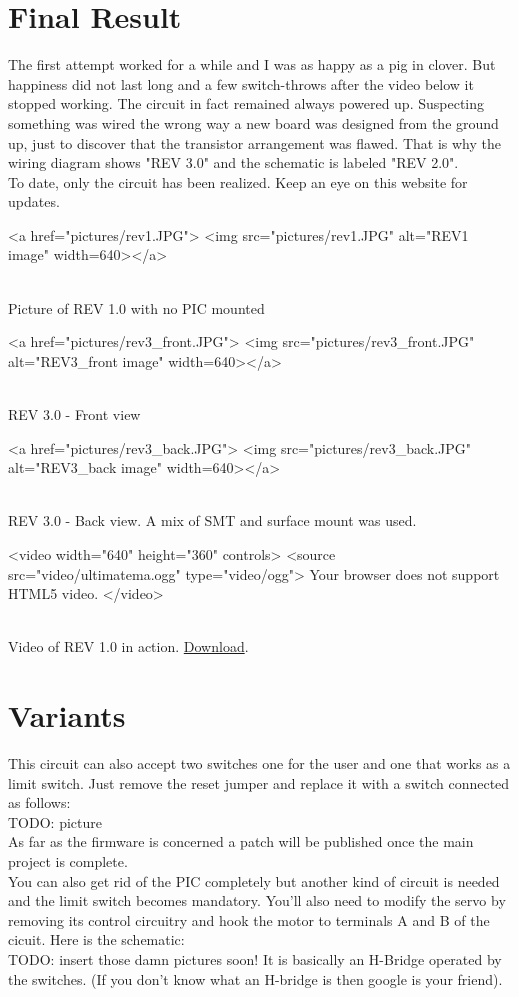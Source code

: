 \documentclass{article}
\begin{document}
\section{Final Result}
The first attempt worked for a while and I was as happy as a pig in clover.
But happiness did not last long and a few switch-throws after the video below it stopped working. The circuit in fact remained always powered up.
Suspecting something was wired the wrong way a new board was designed from the ground up, just to discover that the transistor arrangement was flawed.
That is why the wiring diagram shows "REV 3.0" and the schematic is labeled "REV 2.0".
\\To date, only the circuit has been realized. Keep an eye on this website for updates.
\begin{center}
\begin{html}
<a href="pictures/rev1.JPG">
<img src="pictures/rev1.JPG" alt="REV1 image" width=640></a>
\end{html}
\\Picture of REV 1.0 with no PIC mounted

\begin{html}
<a href="pictures/rev3_front.JPG">
<img src="pictures/rev3_front.JPG" alt="REV3_front image" width=640></a>
\end{html}
\\REV 3.0 - Front view

\begin{html}
<a href="pictures/rev3_back.JPG">
<img src="pictures/rev3_back.JPG" alt="REV3_back image" width=640></a>
\end{html}
\\REV 3.0 - Back view. A mix of SMT and surface mount was used.

\begin{html}
      <video width="640" height="360" controls>
            <source src="video/ultimatema.ogg" type="video/ogg">
            Your browser does not support HTML5 video.
      </video>
\end{html}
\\Video of REV 1.0 in action. \href{video/ultimatema.ogg}{Download}.
\end{center}
%
%
\section{Variants}
This circuit can also accept two switches one for the user and one that works as a limit switch. Just remove the reset jumper and replace it with a switch connected as follows:
\\TODO: picture
\\As far as the firmware is concerned a patch will be published once the main project is complete.
\\You can also get rid of the PIC completely but another kind of circuit is needed and the limit switch becomes mandatory.
You'll also need to modify the servo by removing its control circuitry and hook the motor to terminals A and B of the cicuit.
Here is the schematic:
\\TODO: insert those damn pictures soon!
It is basically an H-Bridge operated by the switches. (If you don't know what an H-bridge is then google is your friend).
%
%
\end{document}
